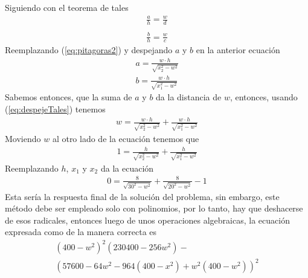 \documentclass[ceqn,10pt]{SelfArx}
\begin{document}
Siguiendo con el teorema de tales
\begin{equation} \label{eq:tales}
\begin{aligned}
	\frac{a}{h} = \frac{w}{d}\\
	\\
	\frac{b}{h} = \frac{w}{c}
\end{aligned}
\end{equation}
Reemplazando (\ref{eq:pitagoras2}) y despejando $a$ y $b$ en la anterior ecuación
\begin{equation} \label{eq:despejeTales}
\begin{aligned}
	a = \frac{w \cdot h}{\sqrt{x_{2}^2-w^2}}\\
	b = \frac{w \cdot h}{\sqrt{x_{1}^2-w^2}}
\end{aligned}
\end{equation}
Sabemos entonces, que la suma de $a$ y $b$ da la distancia de $w$, entonces,
usando (\ref{eq:despejeTales}) tenemos
\begin{equation} \label{eq:obtenerW}
\begin{aligned}
	w = \frac{w \cdot h}{\sqrt{x_{2}^2-w^2}} + \frac{w \cdot h}{\sqrt{x_{1}^2-w^2}}
\end{aligned}
\end{equation}
Moviendo $w$ al otro lado de la ecuación tenemos que
\begin{equation} \label{eq:ecuacionW}
\begin{aligned}
	1 = \frac{h}{\sqrt{x_{2}^2-w^2}} + \frac{h}{\sqrt{x_{1}^2-w^2}}
\end{aligned}
\end{equation}
Reemplazando $h$, $x_{1}$ y $x_{2}$ da la ecuación
\begin{equation} \label{eq:despejeW}
\begin{aligned}
	0 = \frac{8}{\sqrt{30^2-w^2}} + \frac{8}{\sqrt{20^2-w^2}}-1
\end{aligned}
\end{equation}
Esta sería la respuesta final de la solución del problema, sin embargo, este método
debe ser empleado solo con polinomios, por lo tanto, hay que deshacerse de esos
radicales, entonces luego de unos operaciones algebraicas, la ecuación expresada como
de la manera correcta es
\begin{equation} \label{eq:despejeW}
\begin{aligned}
	(400-w^2)^2 (230400-256w^2)-\\
(57600-64 w^2-964 (400-x^2)+w^2 (400-w^2))^2
\end{aligned}
\end{equation}
\end{document}
